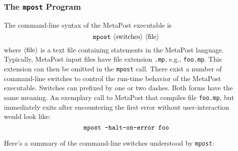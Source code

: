 \begingroup
\renewcommand*{\arraystretch}{1.25}%
\newcommand*{\cmdindex}[1]{\index{command-line!\texttt{mpost}!\texttt{#1}}\texttt{#1}}

\subsubsection*{The \texttt{mpost} Program}
\label{refman:mpost}

The command-line syntax of the MetaPost executable is
$$ {\tt mpost}\ \descr{switches}\ \descr{file}
$$\label{Dmpost}
where ${\langle\hbox{file}\rangle}$ is a text file containing statements in the
MetaPost language.  Typically, MetaPost input files have file extension
\texttt{.mp},
e.g., \texttt{foo.mp}.  This extension can then be omitted in the
\texttt{mpost} call.  There exist a number of command-line switches to
control the run-time behavior of the MetaPost executable.  Switches can
prefixed by one or two dashes.  Both forms have the same meaning.  An
exemplary call to MetaPost that compiles file \texttt{foo.mp}, but
immediately exits after encountering the first error without
user-interaction would look like:
$$ \hbox{\tt mpost -halt-on-error foo} $$

Here's a summary of the command-line switches understood by
\texttt{mpost}:

